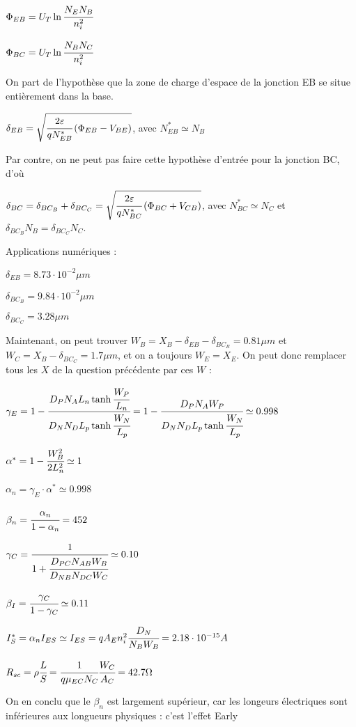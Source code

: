 \documentclass[10pt]{article}
\begin{document}
   $\Phi_{EB} = U_T \ln\cfrac{N_E N_B}{n_i^2}$

   $\Phi_{BC} = U_T \ln\cfrac{N_B N_C}{n_i^2}$

   On part de l'hypothèse que la zone de charge d'espace de la jonction EB se situe entièrement dans la base.

   $\delta_{EB} = \sqrt{\cfrac{2\varepsilon}{qN_{EB}^\ast}\left(\Phi_{EB}-V_{BE}\right)}$, avec $N_{EB}^\ast \simeq N_B$

   Par contre, on ne peut pas faire cette hypothèse d'entrée pour la jonction BC, d'où 

   $\delta_{BC} = \delta_{BC_B} + \delta_{BC_C} = \sqrt{\cfrac{2\varepsilon}{qN_{BC}^\ast}\left(\Phi_{BC}+V_{CB}\right)}$, avec $N_{BC}^\ast \simeq N_C$ et $\delta_{BC_B} N_B = \delta_{BC_C} N_C$.

   Applications numériques :

   $\delta_{EB} = 8.73\cdot 10^{-2} \mu m$

   $\delta_{BC_B} = 9.84\cdot 10^{-2} \mu m$

   $\delta_{BC_C} = 3.28 \mu m$

   Maintenant, on peut trouver $W_B=X_B-\delta_{EB}-\delta_{BC_B} = 0.81\mu m$ et $W_C = X_B -\delta_{BC_C} = 1.7\mu m$, et on a toujours $W_E = X_E$. On peut donc remplacer tous les $X$ de la question précédente par ces $W$ :

   $\gamma_E = 1 - \cfrac{D_P N_A L_n \tanh\cfrac{W_P}{L_n}}{D_N N_D L_p \tanh\cfrac{W_N}{L_p}} = 1 - \cfrac{D_P N_A W_P}{D_N N_D L_p \tanh\cfrac{W_N}{L_p}} \simeq 0.998$

   $\alpha^\ast = 1 - \cfrac{W_B^2}{2 L_n^2} \simeq 1$

   $\alpha_n = \gamma_E \cdot \alpha^\ast \simeq 0.998$

   $\beta_n = \cfrac{\alpha_n}{1-\alpha_n} = 452$

   $\gamma_C = \cfrac{1}{1 + \cfrac{D_{PC} N_{AB} W_B}{D_{NB} N_{DC} W_C}} \simeq 0.10$

   $\beta_I = \cfrac{\gamma_C}{1-\gamma_C} \simeq 0.11$

   $I_S^\ast = \alpha_n I_{ES} \simeq I_{ES} = q A_E n_i^2 \cfrac{D_N}{N_B W_B} = 2.18\cdot 10^{-15} A$

   $R_{sc} = \rho\cfrac{L}{S} = \cfrac{1}{q \mu_{EC} N_C}\cfrac{W_C}{A_C} = 42.7\Omega$

   On en conclu que le $\beta_n$ est largement supérieur, car les longeurs électriques sont inférieures aux longueurs physiques : c'est l'effet Early
\end{document}
